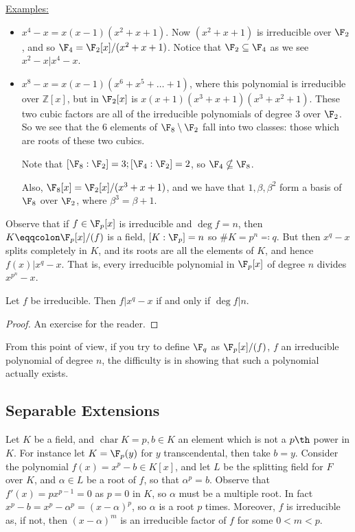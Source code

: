\documentclass[a4paper, 10pt, twocolumn]{amsart}
\renewcommand{\charr}{\operatorname{char}}
\begin{document}
\underline{Examples:} 
\begin{itemize}
\item[$\F_4$:] $x^4-x = x(x-1)(x^2+x+1)$. Now $(x^2+x+1)$ is irreducible over $\F_2$, and so $\F_4 = \F_2[x] / (x^2+x+1)$. Notice that $\F_2 \subseteq \F_4$ as we see $x^2-x | x^4 - x$.
\item[$\F_8$:] $x^8-x = x(x-1)(x^6+x^5+\ldots + 1)$, where this polynomial is irreducible over $\mathbb{Z}[x]$, but in $\F_2[x]$ is $x(x+1)(x^3+x+1)(x^3+x^2+1)$. These two cubic factors are all of the irreducible polynomials of degree 3 over $\F_2$. So we see that the $6$ elements of $\F_8\setminus \F_2$ fall into two classes: those which are roots of these two cubics.

Note that $[\F_8:\F_2] = 3; [\F_4:\F_2] = 2$, so $\F_4 \nsubseteq \F_8$.

Also, $\F_8[x] = \F_2[x]/(x^3+ x+1)$, and we have that $1,\beta, \beta^2$ form a basis of $\F_8$ over $\F_2$, where $\beta^3 = \beta+1$.
\end{itemize}
Observe that if $f\in \F_p[x]$ is irreducible and $\deg f = n$, then $K \eqqcolon \F_p[x]/(f)$ is a field, $[K:\F_p] = n$ so $\#K = p^n \eqqcolon q$. But then $x^q - x$ splits completely in $K$, and its roots are all the elements of $K$, and hence $f(x)|x^q - x$. That is, every irreducible polynomial in $\F_p[x]$ of degree $n$ divides $x^{p^n} - x$.
\begin{proposition}
Let $f$ be irreducible. Then $f|x^q - x$ if and only if $\deg f | n$.
\end{proposition}
\begin{proof}
An exercise for the reader.
\end{proof}
From this point of view, if you try to define $\F_q$ as $\F_p[x]/(f)$, $f$ an irreducible polynomial of degree $n$, the difficulty is in showing that such a polynomial actually exists.

\subsection*{Separable Extensions}
Let $K$ be a field, and $\charr K = p, b\in K$ an element which is not a $p\th$ power in $K$. For instance let $K = \F_p(y)$ for $y$ transcendental, then take $b = y$. Consider the polynomial $f(x) = x^p-b \in K[x]$, and let $L$ be the splitting field for $F$ over $K$, and $\alpha \in L$ be a root of $f$, so that $\alpha^p = b$. Observe that $f'(x) = px^{p-1} = 0$ as $p=0$ in $K$, so $\alpha$ must be a multiple root. In fact $x^p-b = x^p - \alpha^p = (x-\alpha)^p$, so $\alpha$ is a root $p$ times. Moreover, $f$ is irreducible as, if not, then $(x-\alpha)^m$ is an irreducible factor of $f$ for some $0 < m < p$.
\end{document}
